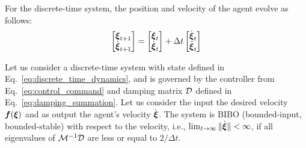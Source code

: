 For the discrete-time system, the position and velocity of the agent evolve as follows:
\begin{equation}
	\begin{bmatrix}
	 \vecs \xi_{t+1} \\ \dot{\vecs \xi}_{t+1}
	\end{bmatrix}
	=
	\begin{bmatrix}
	 \vecs \xi_{t} \\ \dot{\vecs \xi}_{t}
	\end{bmatrix}
	+ 
	\Delta t 
	\begin{bmatrix}
		\dot{\vecs \xi}_{t} \\ \ddot{\vecs \xi}_t 
	\end{bmatrix}
	\label{eq:discrete_time_dynamics}
\end{equation}

\begin{lemma}
	Let us consider a discrete-time system with state defined in Eq.~\eqref{eq:discrete_time_dynamics}, and is governed by the controller from Eq.~\eqref{eq:control_command} and damping matrix $\mathcal{D}$ defined in Eq.~\eqref{eq:damping_summation}.
	Let us consider the input the desired velocity $\boldsymbol{f}(\boldsymbol{\xi})$ and as output the agent's velocity $\dot{\boldsymbol{\xi}}$. 
	The system is BIBO (bounded-input, bounded-stable) with respect to the velocity, i.e., $\lim_{t \rightarrow \infty} \| \dot{\boldsymbol{\xi}} \| < \infty$, if all eigenvalues of $\mathcal{M}^{-1} \mathcal{D}$ are less or equal to $2 / \Delta t$.
\end{lemma}

